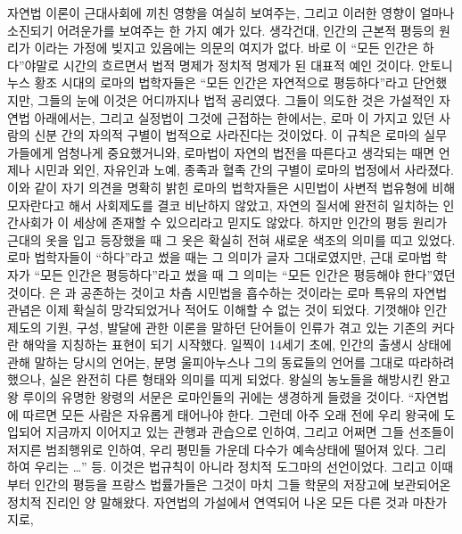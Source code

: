 자연법 이론이
근대사회에 끼친 영향을 여실히 보여주는,
그리고 이러한 영향이 얼마나 소진되기 어려운가를 보여주는
한 가지 예가 있다.
생각건대,
인간의 근본적 평등의 원리가
이라는 가정에
빚지고 있음에는 의문의 여지가 없다.
바로 이 ``모든 인간은 하다''야말로
시간의 흐르면서 법적 명제가 정치적 명제가 된
대표적 예인 것이다.
안토니누스 황조 시대의 로마의 법학자들은
``모든 인간은 자연적으로 평등하다''라고 단언했지만,
그들의 눈에 이것은 어디까지나 법적 공리였다.
그들이 의도한 것은
가설적인 자연법 아래에서는, 그리고 실정법이 그것에 근접하는 한에서는,
로마 이 가지고 있던 사람의 신분 간의 자의적 구별이
법적으로 사라진다는 것이었다.
이 규칙은 로마의 실무가들에게 엄청나게 중요했거니와,
로마법이 자연의 법전을 따른다고 생각되는 때면 언제나
시민과 외인, 자유인과 노예,
종족과 혈족 간의 구별이
로마의 법정에서 사라졌다.
이와 같이 자기 의견을 명확히 밝힌 로마의 법학자들은
시민법이 사변적 법유형에 비해 모자란다고 해서 사회제도를
결코 비난하지 않았고, 자연의 질서에 완전히 일치하는
인간사회가 이 세상에 존재할 수 있으리라고 믿지도 않았다.
하지만 인간의 평등 원리가 근대의 옷을 입고 등장했을 때
그 옷은 확실히 전혀 새로운 색조의 의미를 띠고 있었다.
로마 법학자들이 ``하다''라고 썼을 때는
그 의미가 글자 그대로였지만,
근대 로마법 학자가 ``모든 인간은 평등하다''라고 썼을 때
그 의미는 ``모든 인간은 평등해야 한다''였던 것이다.
은 과 공존하는 것이고 차츰 시민법을 흡수하는 것이라는
로마 특유의 자연법 관념은 이제 확실히 망각되었거나
적어도 이해할 수 없는 것이 되었다.
기껏해야 인간 제도의 기원, 구성, 발달에 관한 이론을 말하던 단어들이
인류가 겪고 있는 기존의 커다란 해악을 지칭하는 표현이 되기 시작했다.
일찍이 14세기 초에, 인간의 출생시 상태에 관해 말하는 당시의 언어는,
분명 울피아누스나 그의 동료들의 언어를 그대로 따라하려 했으나,
실은 완전히 다른 형태와 의미를 띠게 되었다.
왕실의 농노들을 해방시킨
완고왕 루이의 유명한 왕령의 서문은
로마인들의 귀에는 생경하게 들렸을 것이다.
``자연법에 따르면 모든 사람은 자유롭게
태어나야 한다.
그런데 아주 오래 전에 우리 왕국에 도입되어
지금까지 이어지고 있는 관행과 관습으로 인하여,
그리고 어쩌면 그들 선조들이 저지른 범죄행위로 인하여,
우리 평민들 가운데 다수가 예속상태에 떨어져 있다. 그리하여 우리는 \ldots'' 등.
이것은 법규칙이 아니라 정치적 도그마의 선언이었다.
그리고 이때부터 인간의 평등을 프랑스 법률가들은
그것이 마치 그들 학문의 저장고에 보관되어온 정치적 진리인 양 말해왔다.
자연법의 가설에서 연역되어 나온 모든 다른 것과 마찬가지로,
